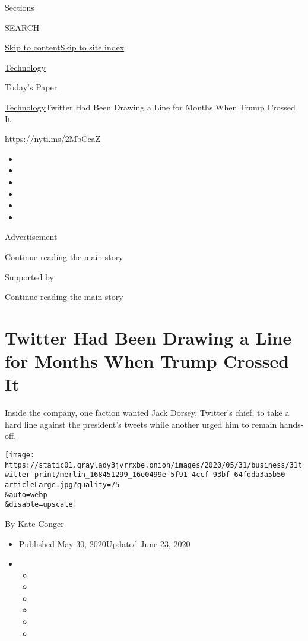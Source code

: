 Sections

SEARCH

\protect\hyperlink{site-content}{Skip to
content}\protect\hyperlink{site-index}{Skip to site index}

\href{https://www.nytimes3xbfgragh.onion/section/technology}{Technology}

\href{https://myaccount.nytimes3xbfgragh.onion/auth/login?response_type=cookie\&client_id=vi}{}

\href{https://www.nytimes3xbfgragh.onion/section/todayspaper}{Today's
Paper}

\href{/section/technology}{Technology}\textbar{}Twitter Had Been Drawing
a Line for Months When Trump Crossed It

\url{https://nyti.ms/2MbCcaZ}

\begin{itemize}
\item
\item
\item
\item
\item
\item
\end{itemize}

Advertisement

\protect\hyperlink{after-top}{Continue reading the main story}

Supported by

\protect\hyperlink{after-sponsor}{Continue reading the main story}

\hypertarget{twitter-had-been-drawing-a-line-for-months-when-trump-crossed-it}{%
\section{Twitter Had Been Drawing a Line for Months When Trump Crossed
It}\label{twitter-had-been-drawing-a-line-for-months-when-trump-crossed-it}}

Inside the company, one faction wanted Jack Dorsey, Twitter's chief, to
take a hard line against the president's tweets while another urged him
to remain hands-off.

\texttt{[image: https://static01.graylady3jvrrxbe.onion/images/2020/05/31/business/31twitter-print/merlin\_168451299\_16e0499e-5f91-4ccf-93bf-64fdda3a5b50-articleLarge.jpg?quality=75\\\&auto=webp\\\&disable=upscale]}

By \href{https://www.nytimes3xbfgragh.onion/by/kate-conger}{Kate Conger}

\begin{itemize}
\item
  Published May 30, 2020Updated June 23, 2020
\item
  \begin{itemize}
  \item
  \item
  \item
  \item
  \item
  \item
  \end{itemize}
\end{itemize}

